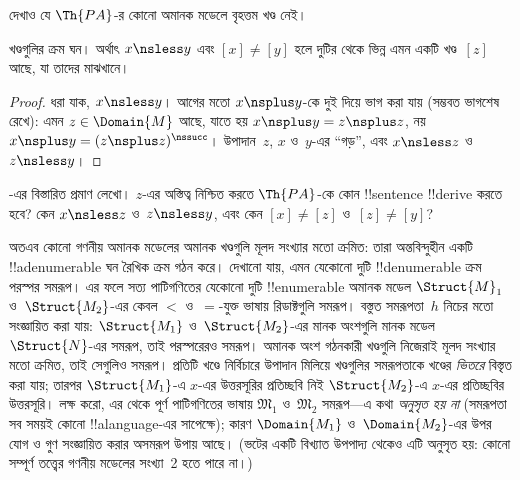\documentclass[../../../include/open-logic-section]{subfiles}
\begin{document}
\begin{prob}
দেখাও যে $\Th{PA}$-র কোনো অমানক মডেলে বৃহত্তম খণ্ড নেই।
\end{prob}

\begin{prop}
খণ্ডগুলির ক্রম ঘন। অর্থাৎ $x \nsless y$ এবং $[x] \neq [y]$ হলে
দুটির থেকে ভিন্ন এমন একটি খণ্ড~$[z]$ আছে, যা তাদের মাঝখানে।
\end{prop}

\begin{proof}
ধরা যাক, $x \nsless y$। আগের মতো $x \nsplus y$-কে দুই দিয়ে ভাগ করা
যায় (সম্ভবত ভাগশেষ রেখে): এমন $z \in \Domain{M}$ আছে, যাতে হয়
$x \nsplus y = z \nsplus z$, নয়
$x \nsplus y = (z \nsplus z)^\nssucc$। উপাদান~$z$, $x$ ও~$y$-এর
``গড়'', এবং $x \nsless z$ ও~$z \nsless y$।
\end{proof}

\begin{prob}
-এর বিস্তারিত প্রমাণ লেখো।
$z$-এর অস্তিত্ব নিশ্চিত করতে $\Th{PA}$-কে কোন !!{sentence}
!!{derive} করতে হবে? কেন $x \nsless z$ ও~$z \nsless y$, এবং কেন
$[x] \neq [z]$ ও~$[z] \neq [y]$?
\end{prob}

\begin{explain}
অতএব কোনো গণনীয় অমানক মডেলের অমানক খণ্ডগুলি মূলদ সংখ্যার মতো
ক্রমিত: তারা অন্তবিন্দুহীন একটি !!a{denumerable} ঘন রৈখিক ক্রম গঠন করে।
দেখানো যায়, এমন যেকোনো দুটি !!{denumerable} ক্রম পরস্পর সমরূপ। এর
ফলে সত্য পাটিগণিতের যেকোনো দুটি !!{enumerable} অমানক মডেল
$\Struct{M}_1$ ও~$\Struct{M_2}$-এর কেবল $<$ ও~$=$-যুক্ত ভাষায়
রিডাক্টগুলি সমরূপ। বস্তুত সমরূপতা~$h$ নিচের মতো সংজ্ঞায়িত করা যায়:
$\Struct{M_1}$ ও~$\Struct{M_2}$-এর মানক অংশগুলি মানক মডেল
$\Struct{N}$-এর সমরূপ, তাই পরস্পরেরও সমরূপ। অমানক অংশ গঠনকারী
খণ্ডগুলি নিজেরাই মূলদ সংখ্যার মতো ক্রমিত, তাই সেগুলিও সমরূপ। প্রতিটি
খণ্ডে নির্বিচারে উপাদান মিলিয়ে খণ্ডগুলির সমরূপতাকে খণ্ডের
\emph{ভিতরে} বিস্তৃত করা যায়; তারপর $\Struct{M_1}$-এ $x$-এর
উত্তরসূরির প্রতিচ্ছবি নিই $\Struct{M_2}$-এ $x$-এর প্রতিচ্ছবির
উত্তরসূরি। লক্ষ করো, এর থেকে পূর্ণ পাটিগণিতের ভাষায়
$\mathfrak{M}_1$ ও~$\mathfrak{M}_2$ সমরূপ---এ কথা \emph{অনুসৃত হয় না}
(সমরূপতা সব সময়ই কোনো !!a{language}-এর সাপেক্ষে); কারণ
$\Domain{M_1}$ ও~$\Domain{M_2}$-এর উপর যোগ ও গুণ সংজ্ঞায়িত করার
অসমরূপ উপায় আছে। (ভটের একটি বিখ্যাত উপপাদ্য থেকেও এটি অনুসৃত হয়:
কোনো সম্পূর্ণ তত্ত্বের গণনীয় মডেলের সংখ্যা~2 হতে পারে না।)
\end{explain}
\end{document}
